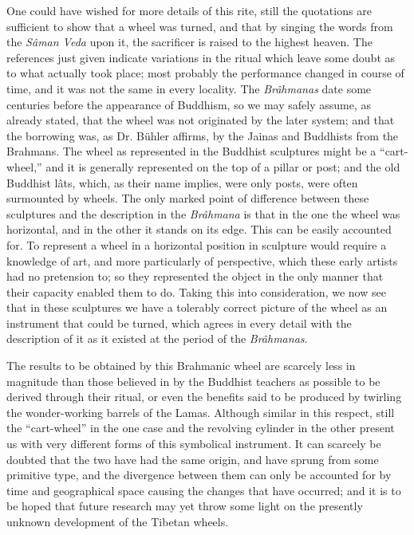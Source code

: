 \documentclass[a4paper, 11pt, oneside, polutonikogreek, english]{article}
\begin{document}
One could have wished for more details of this rite, still the quotations are sufficient to show that a wheel was turned, and that by singing the words from the \emph{Sâman Veda} upon it, the sacrificer is raised to the highest heaven. The references just given indicate variations in the ritual which leave some doubt as to what actually took place; most probably the performance changed in course of time, and it was not the same in every locality. The \emph{Brâhmanas} date some centuries before the appearance of Buddhism, so we may safely assume, as already stated, that the wheel was not originated by the later system; and that the borrowing was, as Dr. Bühler affirms, by the Jainas and Buddhists from the Brahmans. The wheel as represented in the Buddhist sculptures might be a ``cart-wheel,'' and it is generally represented on the top of a pillar or post; and the old Buddhist lâts, which, as their name implies, were only posts, were often surmounted by wheels. The only marked point of difference between these sculptures and the description in the \emph{Brâhmana} is that in the one the wheel was horizontal, and in the other it stands on its edge. This can be easily accounted for. To represent a wheel in a horizontal position in sculpture would require a knowledge of art, and more particularly of perspective, which these early artists had no pretension to; so they represented the object in the only manner that their capacity enabled them to do. Taking this into consideration, we now see that in these sculptures we have a tolerably correct picture of the wheel as an instrument that could be turned, which agrees in every detail with the description of it as it existed at the period of the \emph{Brâhmanas}.

The results to be obtained by this Brahmanic wheel are scarcely less in magnitude than those believed in by the Buddhist teachers as possible to be derived through their ritual, or even the benefits said to be produced by twirling the wonder-working barrels of the Lamas. Although similar in this respect, still the ``cart-wheel'' in the one case and the revolving cylinder in the other present us with very different forms of this symbolical instrument. It can scarcely be doubted that the two have had the same origin, and have sprung from some primitive type, and the divergence between them can only be accounted for by time and geographical space causing the changes that have occurred; and it is to be hoped that future research may yet throw some light on the presently unknown development of the Tibetan wheels.
\end{document}
